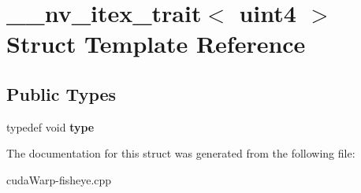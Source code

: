 \hypertarget{struct____nv__itex__trait_3_01uint4_01_4}{}\section{\+\_\+\+\_\+nv\+\_\+itex\+\_\+trait$<$ uint4 $>$ Struct Template Reference}
\label{struct____nv__itex__trait_3_01uint4_01_4}
\subsection*{Public Types}
\begin{DoxyCompactItemize}
\item 
typedef void {\bfseries type}\hypertarget{struct____nv__itex__trait_3_01uint4_01_4_a256a4a7984f2cdfd3d7748175929d760}{}\label{struct____nv__itex__trait_3_01uint4_01_4_a256a4a7984f2cdfd3d7748175929d760}

\end{DoxyCompactItemize}


The documentation for this struct was generated from the following file\+:\begin{DoxyCompactItemize}
\item 
cuda\+Warp-\/fisheye.\+cpp\end{DoxyCompactItemize}
